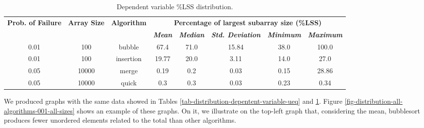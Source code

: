 \begin{table}[H]
    \caption{Dependent variable \%LSS distribution.}
    \begin{center}
    \begin{tabular}{|c|c|c|c|c|c|c|c|}
    \hline
    \textbf{Prob. of Failure} & \textbf{Array Size} & \textbf{Algorithm} & \multicolumn{5}{|c|}{\textbf{Percentage of largest subarray size (\%LSS)}} \\
    \cline{4-8} 
    & & & \textbf{\textit{Mean}}& \textbf{\textit{Median}} & \textbf{\textit{Std. Deviation}} & \textbf{\textit{Minimum}} & \textbf{\textit{Maximum}} \\
    \hline
    0.01 & 100 & bubble & 67.4 & 71.0 & 15.84 & 38.0 & 100.0 \\
    \hline
    0.01 & 100 & insertion & 19.77 & 20.0 & 3.11 & 14.0 & 27.0 \\
    \hline
    0.05 & 10000 & merge & 0.19 & 0.2 & 0.03 & 0.15 & 28.86 \\
    \hline
    0.05 & 10000 & quick & 0.3 & 0.3 & 0.03 & 0.23 & 0.34 \\
    \hline
    \end{tabular}
    \label{tab-distribution-depentent-variable-lss}
    \end{center}
\end{table}

We produced graphs with the same data showed in Tables \ref{tab-distribution-depentent-variable-ueq} and \ref{tab-distribution-depentent-variable-lss}. Figure \ref{fig-distribution-all-algorithms-001-all-sizes} shows an example of these graphs. On it, we illustrate on the top-left graph that, considering the mean, bubblesort produces fewer unordered elements related to the total than other algorithms.

